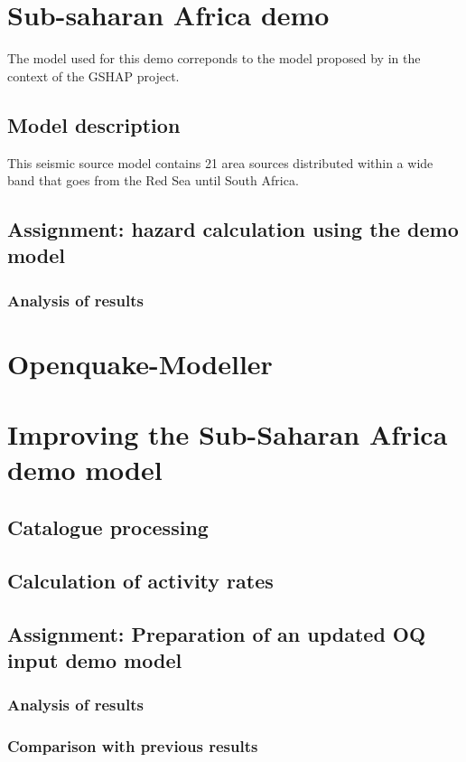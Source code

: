 \documentclass[11pt,a4paper,headings=small,dvips]{scrbook}
\begin{document}
\chapter{Sub-saharan Africa demo}
The model used for this demo correponds to the model proposed by 
\citet{midzi1999} in the context of the GSHAP project.
\section{Model description}
This seismic source model contains 21 area sources distributed within a wide 
band that goes from the Red Sea until South Africa.
\section{Assignment: hazard calculation using the demo model}
\subsection{Analysis of results}
\cleardoublepage
\chapter{Openquake-Modeller}
\cleardoublepage
\chapter{Improving the Sub-Saharan Africa demo model}
\section{Catalogue processing}
\section{Calculation of activity rates}
\section{Assignment: Preparation of an updated OQ input demo model}
\subsection{Analysis of results}
\subsection{Comparison with previous results}
\cleardoublepage


\cleardoublepage
\end{document}
